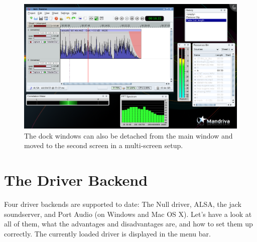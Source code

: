 \begin{figure}
 \centering\includegraphics[width=\textwidth]{../images/sshot03.png}
 \caption{The dock windows can also be detached from the main window and moved to the second screen in a multi-screen setup.}
 \label{fig_mainwin02}
\end{figure}

\section{The Driver Backend}
Four driver backends are supported to date: The Null driver, ALSA, the jack soundserver, and Port Audio (on Windows and Mac OS X). Let's have a look at all of them, what the advantages and disadvantages are, and how to set them up correctly. The currently loaded driver is displayed in the menu bar.

